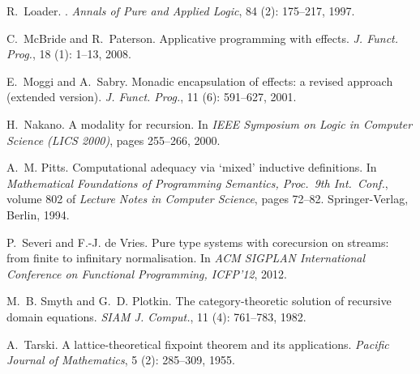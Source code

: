 \documentclass[natbib]{sigplanconf}
\begin{document}
\begin{thebibliography}{24}
R.~Loader.
.
\newblock \emph{Annals of Pure and Applied Logic}, 84 (2):
  175--217, 1997.

C.~McBride and R.~Paterson.
\newblock Applicative programming with effects.
\newblock \emph{J. Funct. Prog.}, 18 (1): 1--13, 2008.

E.~Moggi and A.~Sabry.
\newblock Monadic encapsulation of effects: a revised approach (extended
  version).
\newblock \emph{J. Funct. Prog.}, 11 (6): 591--627, 2001.

H.~Nakano.
\newblock A modality for recursion.
\newblock In \emph{IEEE Symposium on Logic in Computer Science (LICS 2000)},
  pages 255--266, 2000.

A.~M. Pitts.
\newblock Computational adequacy via `mixed' inductive definitions.
\newblock In \emph{Mathematical Foundations of Programming Semantics, Proc.\
  9th Int.\ Conf.}, volume 802 of \emph{Lecture Notes in Computer Science},
  pages 72--82. Springer-Verlag, Berlin, 1994.

P.~Severi and F.-J. {de Vries}.
\newblock Pure type systems with corecursion on streams: from finite to
  infinitary normalisation.
\newblock In \emph{ACM SIGPLAN International Conference on Functional
  Programming, ICFP'12}, 2012.

M.~B. Smyth and G.~D. Plotkin.
\newblock The category-theoretic solution of recursive domain equations.
\newblock \emph{SIAM J. Comput.}, 11 (4):\penalty0 761--783, 1982.

A.~Tarski.
\newblock A lattice-theoretical fixpoint theorem and its applications.
\newblock \emph{Pacific Journal of Mathematics}, 5 (2):\penalty0
  285--309, 1955.

\end{thebibliography}


% 
% 

%
\end{document}
